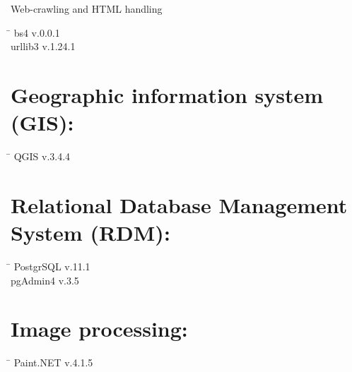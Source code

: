 \begin{large}Web-crawling and HTML handling\end{large}
 \begin{tabbing}
  \hspace*{5cm}  \= \kill
   bs4 \> v.0.0.1 \\
   urllib3 \> v.1.24.1 \\
 \end{tabbing}
 
 \section*{Geographic information system (GIS):}
  \begin{tabbing}
  \hspace*{5cm}  \= \kill
   QGIS \> v.3.4.4
 \end{tabbing}
 \section*{Relational Database Management System (RDM):}
  \begin{tabbing}
  \hspace*{5cm}  \= \kill
   PostgrSQL \> v.11.1 \\
   pgAdmin4 \> v.3.5
 \end{tabbing}
 
 \section*{Image processing:}
  \begin{tabbing}
  \hspace*{5cm}  \= \kill
   Paint.NET \> v.4.1.5
 \end{tabbing}

 
 
 
 
 
 
 
 
 
 
 
 
 
 
 
 

